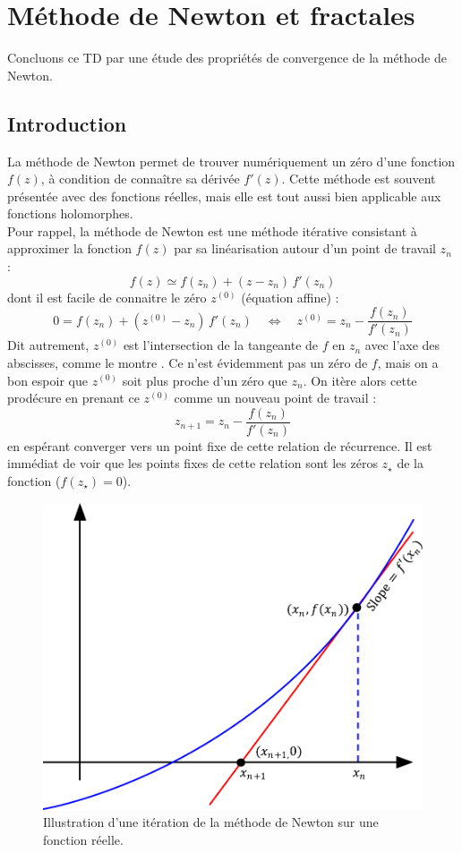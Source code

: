 \documentclass{book}
\begin{document}

\newpage
\section{Méthode de Newton et fractales}

Concluons ce TD par une étude des propriétés de convergence de la méthode de Newton.\\

\subsection{Introduction}

La méthode de Newton permet de trouver numériquement un zéro d'une fonction $f(z)$, à condition de connaître sa dérivée $f'(z)$. Cette méthode est souvent présentée avec des fonctions réelles, mais elle est tout aussi bien applicable aux fonctions holomorphes.\\

Pour rappel, la méthode de Newton est une méthode itérative consistant à approximer la fonction $f(z)$ par sa linéarisation autour d'un point de travail $z_n$ :
\begin{equation*}
f(z) \simeq f(z_n) + (z-z_n)\,f'(z_n)
\end{equation*}
dont il est facile de connaitre le zéro $z^{(0)}$ (équation affine) :
\begin{equation*}
0 = f(z_n) + (z^{(0)} - z_n)\,f'(z_n) \quad \Leftrightarrow \quad z^{(0)} = z_n - \frac{f(z_n)}{f'(z_n)}
\end{equation*}
Dit autrement, $z^{(0)}$ est l'intersection de la tangeante de $f$ en $z_n$ avec l'axe des abscisses, comme le montre . Ce n'est évidemment pas un zéro de $f$, mais on a bon espoir que $z^{(0)}$ soit plus proche d'un zéro que $z_n$. On itère alors cette prodécure en prenant ce $z^{(0)}$ comme un nouveau point de travail :
\begin{equation*}
z_{n+1} = z_n - \frac{f(z_n)}{f'(z_n)}
\end{equation*}
en espérant converger vers un point fixe de cette relation de récurrence. Il est immédiat de voir que les points fixes de cette relation sont les zéros $z_\star$ de la fonction ($f(z_\star)=0$).

\begin{figure}[H]
\centering
\includegraphics[width=0.5\linewidth]{TD2/newton_iteration.pdf}
\caption{Illustration d'une itération de la méthode de Newton sur une fonction réelle.}
\end{figure}
\end{document}
